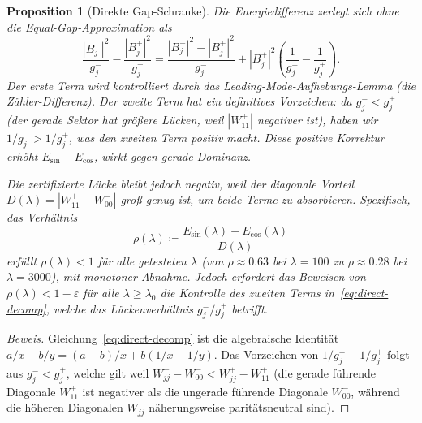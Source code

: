 \documentclass[12pt,a4paper]{article}
\newtheorem{proposition}[theorem]{Proposition}
\theoremstyle{definition}
\theoremstyle{remark}
\begin{document}
\begin{proposition}[Direkte Gap-Schranke]
\label{prop:direct-gap}
Die Energiedifferenz zerlegt sich ohne die Equal-Gap-Approximation als
\begin{equation}
\label{eq:direct-decomp}
  \frac{|B_j^-|^2}{g_j^-} - \frac{|B_j^+|^2}{g_j^+}
  = \frac{|B_j^-|^2 - |B_j^+|^2}{g_j^-} + |B_j^+|^2\!\left(\frac{1}{g_j^-} - \frac{1}{g_j^+}\right).
\end{equation}
Der erste Term wird kontrolliert durch das Leading-Mode-Aufhebungs-Lemma (die Zähler-Differenz). Der zweite Term hat ein definitives Vorzeichen: da $g_j^- < g_j^+$ (der gerade Sektor hat größere Lücken, weil $|W_{11}^+|$ negativer ist), haben wir $1/g_j^- > 1/g_j^+$, was den zweiten Term \emph{positiv} macht. Diese positive Korrektur \emph{erhöht} $E_{\sin} - E_{\cos}$, wirkt \emph{gegen} gerade Dominanz.

Die zertifizierte Lücke bleibt jedoch negativ, weil der diagonale Vorteil $D(\lambda) = |W_{11}^+ - W_{00}^-|$ groß genug ist, um beide Terme zu absorbieren. Spezifisch, das Verhältnis
\[
  \rho(\lambda) \coloneqq \frac{E_{\sin}(\lambda) - E_{\cos}(\lambda)}{D(\lambda)}
\]
erfüllt $\rho(\lambda) < 1$ für alle getesteten $\lambda$ (von $\rho \approx 0.63$ bei $\lambda = 100$ zu $\rho \approx 0.28$ bei $\lambda = 3000$), mit monotoner Abnahme. Jedoch erfordert das Beweisen von $\rho(\lambda) < 1 - \varepsilon$ für alle $\lambda \geq \lambda_0$ die Kontrolle des zweiten Terms in~\eqref{eq:direct-decomp}, welche das Lückenverhältnis $g_j^-/g_j^+$ betrifft.
\end{proposition}

\begin{proof}[Beweis]
Gleichung~\eqref{eq:direct-decomp} ist die algebraische Identität $a/x - b/y = (a-b)/x + b(1/x - 1/y)$. Das Vorzeichen von $1/g_j^- - 1/g_j^+$ folgt aus $g_j^- < g_j^+$, welche gilt weil $W_{jj}^- - W_{00}^- < W_{jj}^+ - W_{11}^+$ (die gerade führende Diagonale $W_{11}^+$ ist negativer als die ungerade führende Diagonale $W_{00}^-$, während die höheren Diagonalen $W_{jj}$ näherungsweise paritätsneutral sind).
\end{proof}
\end{document}
